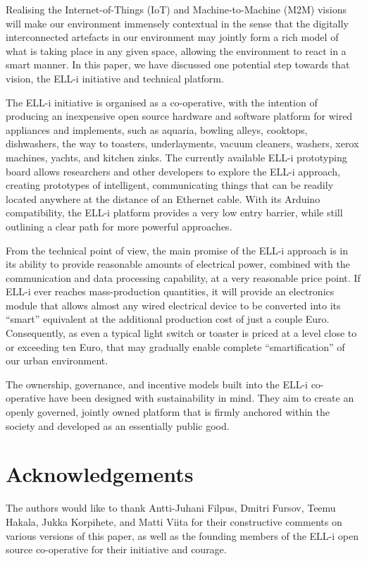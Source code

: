 \documentclass{siamltex}
\begin{document}
Realising the Internet-of-Things (IoT) and Machine-to-Machi\-ne (M2M)
visions will make our environment immensely contextual in the sense
that the digitally interconnected artefacts in our environment may
jointly form a rich model of what is taking place in any given space,
allowing the environment to react in a smart manner.  In this paper,
we have discussed one potential step towards that vision, the ELL-i
initiative and technical platform.

The ELL-i initiative is organised as a co-operative, with the
intention of producing an inexpensive open source hardware and software
platform for wired appliances and implements, such as aquaria, bowling
alleys, cooktops, dishwashers, the way to toasters, underlayments,
vacuum cleaners, washers, xerox machines, yachts, and kitchen zinks.
The currently available ELL-i prototyping board allows researchers and
other developers to explore the ELL-i approach, creating prototypes of
intelligent, communicating things that can be readily located anywhere
at the distance of an Ethernet cable.  With its Arduino compatibility,
the ELL-i platform provides a very low entry barrier, while still
outlining a clear path for more powerful approaches.

From the technical point of view, the main promise of the ELL-i
approach is in its ability to provide reasonable amounts of electrical
power, combined with the communication and data processing capability,
at a very reasonable price point.  If ELL-i ever reaches
mass-production quantities, it will provide an electronics module that
allows almost any wired electrical device to be converted into its
``smart'' equivalent at the additional production cost of just a
couple Euro.  Consequently, as even a typical light switch or toaster
is priced at a level close to or exceeding ten Euro, that may
gradually enable complete ``smartification'' of our urban
environment. 

The ownership, governance, and incentive models built into the ELL-i
co-operative have been designed with sustainability in mind.  They aim
to create an openly governed, jointly owned platform that is firmly
anchored within the society and developed as an essentially public good.

\section*{Acknowledgements}

The authors would like to thank Antti-Juhani Filpus, Dmitri Fursov,
Teemu Hakala, Jukka Korpihete, and Matti Viita for their constructive
comments on various versions of this paper, as well as the founding
members of the ELL-i open source co-operative for their initiative and
courage.

{}

\end{document}
